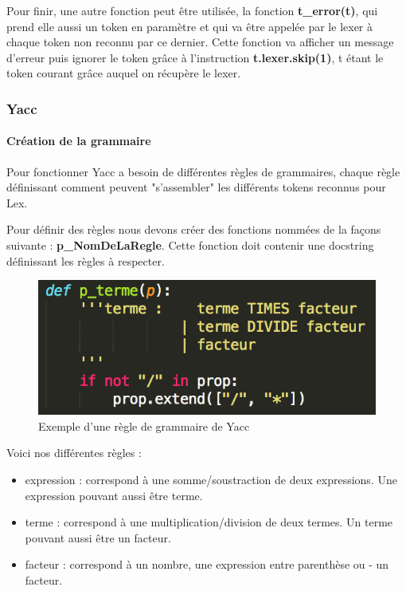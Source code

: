 \documentclass[a4paper,12pt]{article}
\begin{document}
				Pour finir, une autre fonction peut être utilisée, la fonction \textbf{t\_error(t)}, qui prend elle aussi un token en paramètre et qui va être appelée par le lexer à chaque token non reconnu par ce dernier. Cette fonction va afficher un message d'erreur puis ignorer le token grâce à l'instruction \textbf{t.lexer.skip(1)}, t étant le token courant grâce auquel on récupère le lexer. 

		\subsubsection{Yacc}

			\paragraph{Création de la grammaire}

				Pour fonctionner Yacc a besoin de différentes règles de grammaires, chaque règle définissant comment peuvent "s'assembler" les différents tokens reconnus pour Lex.

				Pour définir des règles nous devons créer des fonctions nommées de la façons suivante : \textbf{p\_NomDeLaRegle}. Cette fonction doit contenir une docstring définissant les règles à respecter.

				\begin{figure}[h!]
					\begin{center}
						\includegraphics[scale=1]{images/exp_grammaire_yacc}
						\caption{Exemple d'une règle de grammaire de Yacc}
					\end{center}
				\end{figure}

				Voici nos différentes règles : 
				\begin{itemize}
					\item expression : correspond à une somme/soustraction de deux expressions. Une expression pouvant aussi être terme.
					\item terme : correspond à une multiplication/division de deux termes. Un terme pouvant aussi être un facteur.
					\item facteur : correspond à un nombre, une expression entre parenthèse ou - un facteur.
				\end{itemize}
\end{document}
